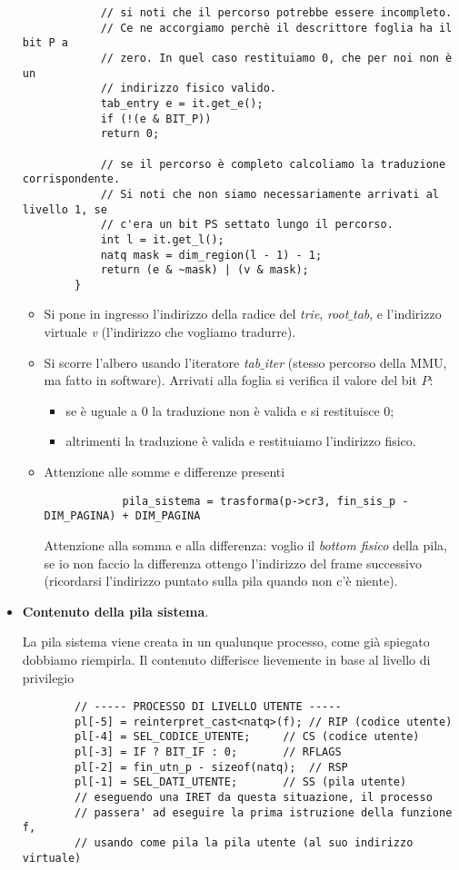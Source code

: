 \begin{itemize}
\begin{verbatim}
			// si noti che il percorso potrebbe essere incompleto.
			// Ce ne accorgiamo perchè il descrittore foglia ha il bit P a
			// zero. In quel caso restituiamo 0, che per noi non è un
			// indirizzo fisico valido.
			tab_entry e = it.get_e();
			if (!(e & BIT_P))
			return 0;
			
			// se il percorso è completo calcoliamo la traduzione corrispondente.
			// Si noti che non siamo necessariamente arrivati al livello 1, se
			// c'era un bit PS settato lungo il percorso.
			int l = it.get_l();
			natq mask = dim_region(l - 1) - 1;
			return (e & ~mask) | (v & mask);
		}
	\end{verbatim}
	\normalsize
	\begin{itemize}
		\item Si pone in ingresso l'indirizzo della radice del \emph{trie}, \emph{root$\_$tab}, e l'indirizzo virtuale \emph{v} (l'indirizzo che vogliamo tradurre).
		\item Si scorre l'albero usando l'iteratore \emph{tab$\_$iter} (stesso percorso della MMU, ma fatto in software). Arrivati alla foglia si verifica il valore del bit $P$:
		\begin{itemize}
			\item se è uguale a $0$ la traduzione non è valida e si restituisce 0;
			\item altrimenti la traduzione è valida e restituiamo l'indirizzo fisico.
		\end{itemize} 
		\item Attenzione alle somme e differenze presenti
		\begin{verbatim}
			pila_sistema = trasforma(p->cr3, fin_sis_p - DIM_PAGINA) + DIM_PAGINA\end{verbatim}
		Attenzione alla somma e alla differenza: voglio il \textit{bottom fisico} della pila, se io non faccio la differenza ottengo l'indirizzo del frame successivo (ricordarsi l'indirizzo puntato sulla pila quando non c'è niente).
	\end{itemize}
	
	\item \textbf{Contenuto della pila sistema}. 
	
	La pila sistema viene creata in un qualunque processo, come già spiegato dobbiamo riempirla. Il contenuto differisce lievemente in base al livello di privilegio 
	\small
	\begin{verbatim}
		// ----- PROCESSO DI LIVELLO UTENTE -----
		pl[-5] = reinterpret_cast<natq>(f); // RIP (codice utente)
		pl[-4] = SEL_CODICE_UTENTE;	    // CS (codice utente)
		pl[-3] = IF ? BIT_IF : 0;	    // RFLAGS
		pl[-2] = fin_utn_p - sizeof(natq);  // RSP
		pl[-1] = SEL_DATI_UTENTE;	    // SS (pila utente)
		// eseguendo una IRET da questa situazione, il processo
		// passera' ad eseguire la prima istruzione della funzione f,
		// usando come pila la pila utente (al suo indirizzo virtuale)
		

\end{verbatim}
\end{itemize}
